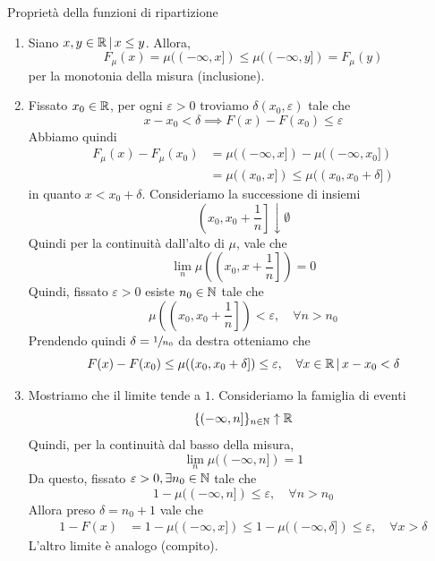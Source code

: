 \documentclass[a4paper]{article}
\begin{document}
\begin{snippetproof}{Proprietà della funzioni di ripartizione}
    \begin{enumerate}
        \item Siano \(x,y \in \mathbb{R} \,|\, x \leq y\).
            Allora, \[
                F_\mu(x) = \mu((-\infty, x])
                \leq \mu((-\infty, y]) = F_\mu(y)
            \]
            per la monotonia della misura (inclusione).
        \item Fissato \(x_0 \in \mathbb{R}\), per ogni \(\varepsilon > 0\)
            troviamo \(\delta(x_0, \varepsilon)\)
            tale che
            \[
                x-x_0 < \delta \implies F(x) - F(x_0) \leq \varepsilon
            \]
            Abbiamo quindi
            \begin{align*}
                F_\mu(x) - F_\mu(x_0)
                &= \mu((-\infty, x]) - \mu((-\infty, x_0]) \\
                &= \mu((x_0, x]) \leq \mu((x_0, x_0 + \delta])
            \end{align*}
            in quanto \(x < x_0 + \delta\).
            Consideriamo la successione di insiemi
            \[
                \left(x_0, x_0 + \frac1n\right] \downarrow \emptyset
            \]
            Quindi per la continuità dall'alto di \(\mu\),
            vale che
            \[
                \lim_n \mu\left(
                    \left(x_0, x + \frac1n\right]
                \right) = 0
            \]
            Quindi, fissato \(\varepsilon > 0\)
            esiste \(n_0 \in \mathbb{N}\) tale che
            \[
                \mu\left(\left(x_0, x_0 + \frac1n\right]\right) < \varepsilon,
                \quad \forall n > n_0
            \]
            Prendendo quindi \(\delta = \sfrac1{n_0}\) da destra otteniamo che
            \[
                F(x) - F(x_0) \leq \mu((x_0, x_0 + \delta])
                \leq \varepsilon, \quad \forall x \in \mathbb{R} \,|\, x-x_0 < \delta
            \]
        \item Mostriamo che il limite tende a \(1\).
            Consideriamo la famiglia di eventi
            \[
                \{
                    (-\infty, n]
                \}_{n \in \mathbb{N}} \uparrow \mathbb{R}
            \]
            Quindi, per la continuità
            dal basso della misura, \[
                \lim_n \mu((-\infty, n]) = 1
            \]
            Da questo, fissato \(\varepsilon > 0, \exists n_0 \in \mathbb{N}\)
            tale che
            \[
                1 - \mu((-\infty, n]) \leq \varepsilon, \quad \forall n > n_0
            \]
            Allora preso \(\delta = n_0 + 1\) vale che
            \begin{align*}
                1 - F(x) &= 1 - \mu((-\infty, x]) \leq 1 - \mu((-\infty, \delta]) \leq \varepsilon,
                \quad \forall x > \delta
            \end{align*}
            L'altro limite è analogo (compito).
    \end{enumerate}
\end{snippetproof}
\end{document}
